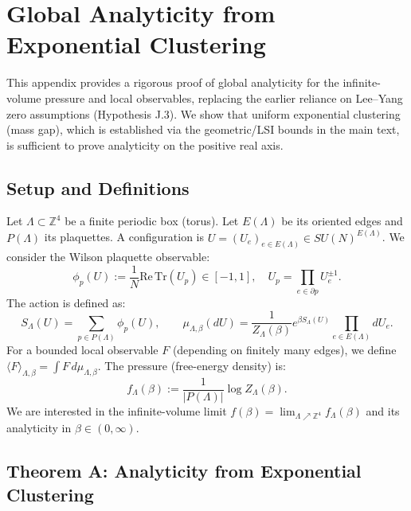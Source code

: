 \section{Global Analyticity from Exponential Clustering}
\label{app:analyticity_clustering}

This appendix provides a rigorous proof of global analyticity for the infinite-volume pressure and local observables, replacing the earlier reliance on Lee--Yang zero assumptions (Hypothesis J.3). We show that uniform exponential clustering (mass gap), which is established via the geometric/LSI bounds in the main text, is sufficient to prove analyticity on the positive real axis.

\subsection{Setup and Definitions}

Let $\Lambda \subset \mathbb{Z}^4$ be a finite periodic box (torus). Let $E(\Lambda)$ be its oriented edges and $P(\Lambda)$ its plaquettes. A configuration is $U = (U_e)_{e \in E(\Lambda)} \in SU(N)^{E(\Lambda)}$. We consider the Wilson plaquette observable:
\begin{equation}
\phi_p(U) := \frac{1}{N} \mathrm{Re} \, \mathrm{Tr}(U_p) \in [-1, 1], \quad U_p = \prod_{e \in \partial p} U_e^{\pm 1}.
\end{equation}
The action is defined as:
\begin{equation}
S_\Lambda(U) = \sum_{p \in P(\Lambda)} \phi_p(U), \qquad \mu_{\Lambda, \beta}(dU) = \frac{1}{Z_\Lambda(\beta)} e^{\beta S_\Lambda(U)} \prod_{e \in E(\Lambda)} dU_e.
\end{equation}
For a bounded local observable $F$ (depending on finitely many edges), we define $\langle F \rangle_{\Lambda, \beta} = \int F \, d\mu_{\Lambda, \beta}$. The pressure (free-energy density) is:
\begin{equation}
f_\Lambda(\beta) := \frac{1}{|P(\Lambda)|} \log Z_\Lambda(\beta).
\end{equation}
We are interested in the infinite-volume limit $f(\beta) = \lim_{\Lambda \nearrow \mathbb{Z}^4} f_\Lambda(\beta)$ and its analyticity in $\beta \in (0, \infty)$.

\subsection{Theorem A: Analyticity from Exponential Clustering}

